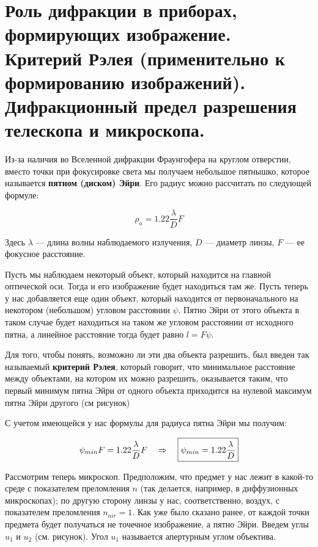 \section{Роль дифракции в приборах, формирующих изображение. Критерий Рэлея (применительно к формированию изображений). Дифракционный предел разрешения телескопа и микроскопа.}

Из-за наличия во Вселенной дифракции Фраунгофера на круглом отверстии, вместо точки при фокусировке света мы получаем небольшое пятнышко, которое называется \textbf{пятном (диском) Эйри}. Его радиус можно рассчитать по следующей формуле:

\begin{equation*}
	\rho_{a} = 1.22 \frac{\lambda}{D} F	
\end{equation*}

Здесь $\lambda$ --- длина волны наблюдаемого излучения, $D$ --- диаметр линзы, $F$ --- ее фокусное расстояние.

Пусть мы наблюдаем некоторый объект, который находится на главной оптической оси. Тогда и его изображение будет находиться там же. Пусть теперь у нас добавляется еще один объект, который находится от первоначального на некотором (небольшом) угловом расстоянии $\psi$. Пятно Эйри от этого объекта в таком случае будет находиться на таком же угловом расстоянии от исходного пятна, а линейное расстояние тогда будет равно $l = F \psi$. 

Для того, чтобы понять, возможно ли эти два объекта разрешить, был введен так называемый \textbf{критерий Рэлея}, который говорит, что минимальное расстояние между объектами, на котором их можно разрешить, оказывается таким, что первый минимум пятна Эйри от одного объекта приходится на нулевой максимум пятна Эйри другого (см рисунок) %

С учетом имеющейся у нас формулы для радиуса пятна Эйри мы получим:

\begin{equation*}
	\psi_{min} F = 1.22 \frac{\lambda}{D} F \quad \Rightarrow \quad \boxed{\psi_{min} = 1.22 \frac{\lambda}{D}}
\end{equation*}

Рассмотрим теперь микроскоп. Предположим, что предмет у нас лежит в какой-то среде с показателем преломления $n$ (так делается, например, в диффузионных микроскопах); по другую сторону линзы у нас, соответственно, воздух, с показателем преломления $n_{air} = 1$. Как уже было сказано ранее, от каждой точки предмета будет получаться не точечное изображение, а пятно Эйри. Введем углы $u_1$ и $u_2$ (см. рисунок). Угол $u_1$ называется апертурным углом объектива. %

